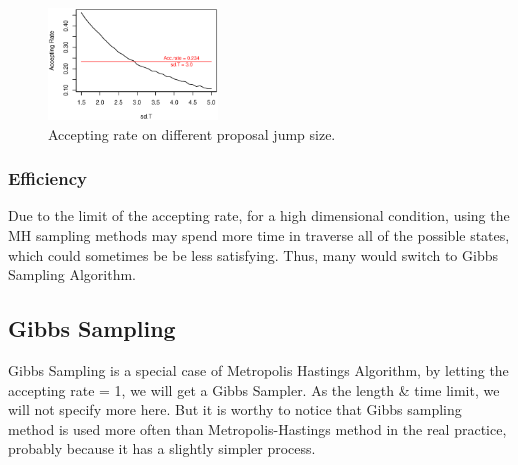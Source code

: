 \begin{figure}[tb]
\vspace{-0.2in}
  	\centering
  	\includegraphics[width=0.4\textwidth]{figure/acc_sdt.eps}
\vspace{-0.2in}
	\caption{Accepting rate on different proposal jump size.}
	\label{fig:acc_sdt}
\end{figure}

\subsubsection{Efficiency}
Due to the limit of the accepting rate, for a high dimensional condition, using the MH sampling methods may spend more time in traverse all of the possible states, which could sometimes be be less satisfying. Thus, many would switch to Gibbs Sampling Algorithm.




\subsection{Gibbs Sampling}
Gibbs Sampling is a special case of Metropolis Hastings Algorithm, by letting the accepting rate = 1, we will get a Gibbs Sampler. As the length \& time limit, we will not specify more here.
But it is worthy to notice that Gibbs sampling method is used more often than Metropolis-Hastings method in the real practice, probably because it has a slightly simpler process.






